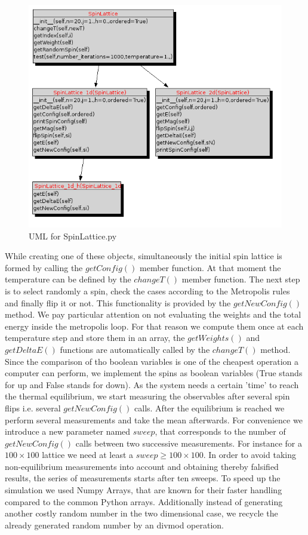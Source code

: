 \documentclass[12pt,a4paper,titlepage]{article}
\begin{document}
\begin{figure}[h]
\centering
\includegraphics[width=\linewidth]{Plots/umlSpinLattice}
\caption{UML for SpinLattice.py}
\label{fig:umlspin}

\end{figure}

While creating one of these objects, simultaneously the initial spin lattice is formed by calling the $getConfig()$ member function. At that moment the temperature can be defined by the $changeT()$ member function. The next step is to select randomly a spin, check the cases according to the Metropolis rules and finally flip it or not. This functionality is provided by the $getNewConfig()$ method.
We pay particular attention on not evaluating the weights and the total energy inside the metropolis loop. For that reason we compute them once at each temperature step and store them in an array, the $getWeights()$ and $getDeltaE()$ functions are automatically called by the $changeT()$ method.
Since the comparison of tho boolean variables is one of the cheapest operation a computer can perform, we implement the spins as boolean variables (True stands for up and False stands for down).
As the system needs a certain 'time' to reach the thermal equilibrium, we start measuring the observables after several spin flips i.e. several $getNewConfig()$ calls. After the equilibrium is reached we perform several measurements and take the mean afterwards. For convenience we introduce a new parameter named $sweep$, that corresponds to the number of $getNewConfig()$ calls between two successive measurements. For instance for a $100\times100$ lattice we need at least a $sweep \geq 100\times100$. In order to avoid taking non-equilibrium measurements into account and obtaining thereby falsified results, the series of measurements starts after ten sweeps.
To speed up the simulation we used Numpy Arrays, that are known for their faster handling compared to the common Python arrays. Additionally instead of generating another costly random number in the two dimensional case, we recycle the already generated random number by an divmod operation.
\end{document}
